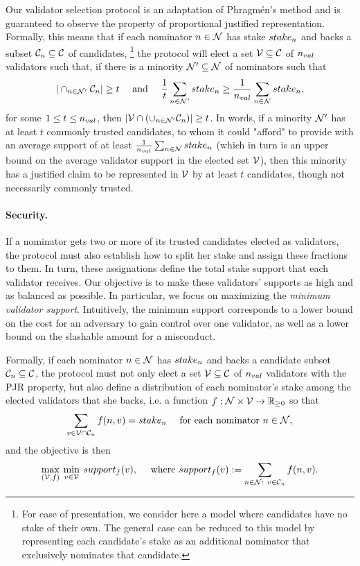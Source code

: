 Our validator selection protocol is an adaptation of Phragm\'{e}n's method and is guaranteed 
to observe the property of proportional justified representation. 
Formally, this means that if each nominator $n \in \mathcal{N}$ has stake $stake_{n}$ 
and backs a subset $\mathcal{C}_{n}\subseteq \mathcal{C}$ of candidates,%
%
\footnote{For ease of presentation, we consider here a model where candidates have no stake of their own. 
The general case can be reduced to this model by representing each candidate's stake as an additional nominator 
that exclusively nominates that candidate.} %
%
the protocol will elect a set $\mathcal{V}\subseteq \mathcal{C}$ of $n_{val}$ validators such that, 
if there is a minority $\mathcal{N}'\subseteq \mathcal{N}$ of nominators such that %
%
$$|\cap_{n\in \mathcal{N}'} \mathcal{C}_n| \geq t \quad \text{ and } \quad
\frac{1}{t} \sum_{n\in \mathcal{N}'} stake_{n} \geq \frac{1}{n_{val}} \sum_{n\in \mathcal{N}} stake_{n},$$
%
for some $1\leq t\leq n_{val}$, then $|\mathcal{V}\cap (\cup_{n\in\mathcal{N}'} \mathcal{C}_n)| \geq t$.
In words, if a minority $\mathcal{N}'$ has at least $t$ commonly trusted candidates, 
to whom it could "afford" to provide with an average support of at least 
$\frac{1}{n_{val}} \sum_{n\in \mathcal{N}} stake_{n}$ 
(which in turn is an upper bound on the average validator support in the elected set $\mathcal{V}$), 
then this minority has a justified claim to be represented in $\mathcal{V}$ by at least $t$ candidates,  
though not necessarily commonly trusted.

\paragraph{Security.} If a nominator gets two or more of its trusted candidates elected as validators,
the protocol must also establish how to split her stake and assign these fractions to them.
In turn, these assignations define the total stake support that each validator receives.
Our objective is to make these validators' supports as high and as balanced as possible.
In particular, we focus on maximizing the \emph{minimum validator support}.
Intuitively, the minimum support corresponds to a lower bound on the cost for an adversary to gain control
over one validator, as well as a lower bound on the slashable amount for a misconduct.

Formally, if each nominator $n \in \mathcal{N}$ has $stake_{n}$ and backs a candidate subset $\mathcal{C}_{n}\subseteq \mathcal{C}$,
the protocol must not only elect a set $\mathcal{V}\subseteq \mathcal{C}$ of $n_{val}$ validators
with the PJR property, but also define a distribution of each nominator's stake among the elected validators that she backs,
i.e. a function $f:\mathcal{N}\times\mathcal{V} \rightarrow \mathbb{R}_{\geq 0}$ so that
$$\sum_{v\in \mathcal{V}\cap \mathcal{C}_{n}} f(n, v) = stake_{n} \quad \text{ for each nominator } n\in\mathcal{N},$$
and the objective is then
$$\max_{(\mathcal{V}, f)} \: \min_{v\in \mathcal{V}} \: support_f(v),
\quad \text{ where } support_f(v) := \sum_{n\in \mathcal{N}: \ v\in \mathcal{C}_{n}} f(n, v). $$

